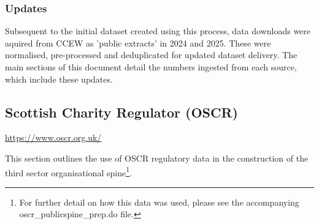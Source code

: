 \documentclass{article}
\begin{document}
\subsubsection{Updates}
Subsequent to the initial dataset created using this process, data downloads were aquired from CCEW as 
'public extracts' in 2024 and 2025. These were normalised, pre-processed and deduplicated for updated dataset delivery. The main sections
of this document detail the numbers ingested from each source, which include these updates.

\clearpage%
\subsection{Scottish Charity Regulator (OSCR)}
\url{https://www.oscr.org.uk/}

This section outlines the use of OSCR regulatory data in the construction of the third sector
organisational spine\footnote{ For further detail on how this data was used, please see the accompanying
oscr\_publicspine\_prep.do file.}.
\end{document}
